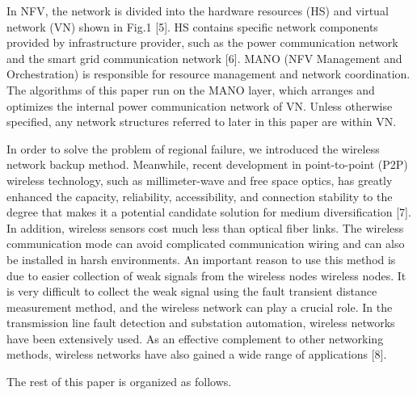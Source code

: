 \documentclass[journal]{IEEEtran}
\begin{document}
\par In NFV, the network is divided into the hardware resources (HS) and virtual network (VN) shown in Fig.1 [5]. HS contains specific network components provided by infrastructure provider, such as the power communication network and the smart grid communication network [6]. MANO (NFV Management and Orchestration) is responsible for resource management and network coordination. The algorithms of this paper run on the MANO layer, which arranges and optimizes the internal power communication network of VN. Unless otherwise specified, any network structures referred to later in this paper are within VN.

\par In order to solve the problem of regional failure, we introduced the wireless network backup method. Meanwhile, recent development in point-to-point (P2P) wireless technology, such as millimeter-wave and free space optics, has greatly enhanced the capacity, reliability, accessibility, and connection stability to the degree that makes it a potential candidate solution for medium diversification [7]. In addition, wireless sensors cost much less than optical fiber links. The wireless communication mode can avoid complicated communication wiring and can also be installed in harsh environments. An important reason to use this method is due to easier collection of weak signals from the wireless nodes wireless nodes. It is very difficult to collect the weak signal using the fault transient distance measurement method, and the wireless network can play a crucial role. In the transmission line fault detection and substation automation, wireless networks have been extensively used. As an effective complement to other networking methods, wireless networks have also gained a wide range of applications [8].
\par The rest of this paper is organized as follows. %
\end{document}
